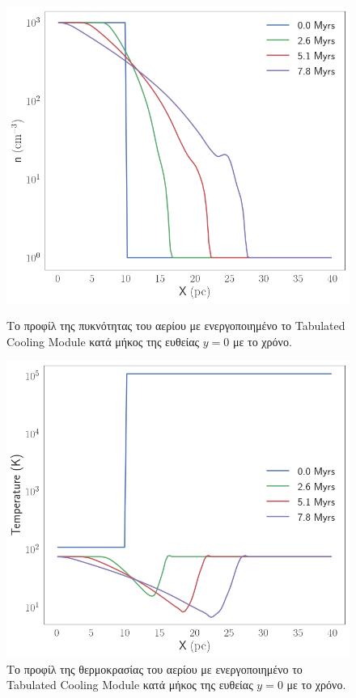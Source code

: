 \documentclass[article,a4paper,11.2pt]{memoir}
\numberwithin{equation}{subsection}
\begin{document}
	\begin{figure}[h]
		\begin{adjustwidth*}{-5cm}{-0cm}%
		\centering
		\includegraphics[width=1\linewidth]{DataImages/TabCoolingRHOprofile}
		\caption{Το προφίλ της πυκνότητας του αερίου με ενεργοποιημένο το Tabulated Cooling Module κατά μήκος της ευθείας $y=0$ με το χρόνο.}
		\label{fig:tabcoolingrhoprofile}
		
		\includegraphics[width=1\linewidth]{DataImages/TabCoolingTMPprofile}
		\caption{Το προφίλ της θερμοκρασίας του αερίου με ενεργοποιημένο το Tabulated Cooling Module κατά μήκος της ευθείας $y=0$ με το χρόνο.}
		\label{fig:tabcoolingtmpprofile}
		

\end{adjustwidth*}
\end{figure}
\end{document}
